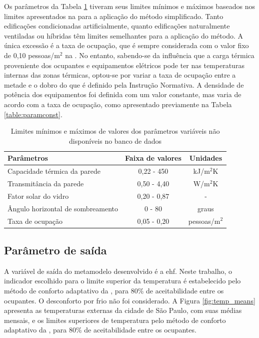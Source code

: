 \documentclass[brazil,hardcopy,openany]{ufscthesis} %
\begin{document}
Os parâmetros da Tabela \ref{table:paraminic} tiveram seus limites mínimos e máximos baseados nos limites apresentados na  para a aplicação do método simplificado. Tanto edificações condicionadas artificialmente, quanto edificações naturalmente ventiladas ou híbridas têm limites semelhantes para a aplicação do método.
A única excessão é a taxa de ocupação, que é sempre considerada com o valor fixo de 0,10 pessoas/m$^2$ na . No entanto, sabendo-se da influência que a carga térmica proveniente dos ocupantes e equipamentos elétricos pode ter nas temperaturas internas das zonas térmicas, optou-se por variar a taxa de ocupação entre a metade e o dobro do que é definido pela Instrução Normativa. A densidade de potência dos equipamentos foi definida com um valor constante, mas varia de acordo com a taxa de ocupação, como apresentado previamente na Tabela \ref{table:paramconst}.

\begin{table}[h]
	\centering
	\caption{Limites mínimos e máximos de valores dos parâmetros variáveis não disponíveis no banco de dados}
	\label{table:paraminic}
	\begin{tabular}{|l |c |c |}
		\hline
		\textbf{Parâmetros} & \textbf{Faixa de valores} & \textbf{Unidades} \\
		\hline
		Capacidade térmica da parede & 0,22 - 450 & kJ/m$^2$K \\
		\hline
		Transmitância da parede & 0,50 - 4,40 & W/m$^2$K \\
		\hline
		Fator solar do vidro & 0,20 - 0,87 & - \\
		\hline 
		Ângulo horizontal de sombreamento & 0 - 80 & graus \\
		\hline 
		Taxa de ocupação & 0,05 - 0,20 & pessoas/m$^2$ \\
		\hline 
	\end{tabular}
\end{table}

\subsection{Parâmetro de saída}

A variável de saída do metamodelo desenvolvido é a \acrfull{ehf}. Neste trabalho, o indicador escolhido para o limite superior da temperatura é estabelecido pelo método de conforto adaptativo da , para 80\% de aceitabilidade entre os ocupantes. O desconforto por frio não foi considerado.
A Figura \ref{fig:temp_means} apresenta as temperaturas externas da cidade de São Paulo, com suas médias mensais, e os limites superiores de temperatura pelo método de conforto adaptativo da , para 80\% de aceitabilidade entre os ocupantes.
\end{document}

